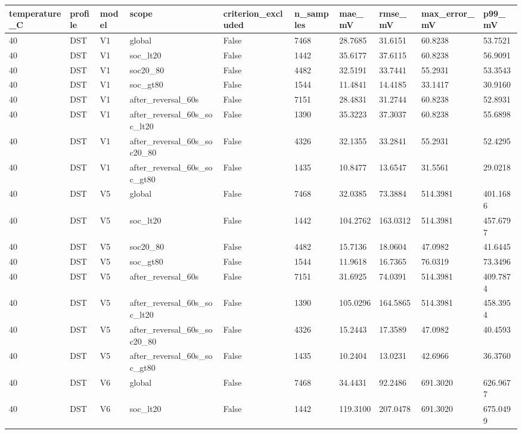 \begin{tabular}{llllllllll}
\hline
temperature\_C & profile & model & scope & criterion\_excluded & n\_samples & mae\_mV & rmse\_mV & max\_error\_mV & p99\_mV \\
\hline
40 & DST & V1 & global & False & 7468 & 28.7685 & 31.6151 & 60.8238 & 53.7521 \\
40 & DST & V1 & soc\_lt20 & False & 1442 & 35.6177 & 37.6115 & 60.8238 & 56.9091 \\
40 & DST & V1 & soc20\_80 & False & 4482 & 32.5191 & 33.7441 & 55.2931 & 53.3543 \\
40 & DST & V1 & soc\_gt80 & False & 1544 & 11.4841 & 14.4185 & 33.1417 & 30.9160 \\
40 & DST & V1 & after\_reversal\_60s & False & 7151 & 28.4831 & 31.2744 & 60.8238 & 52.8931 \\
40 & DST & V1 & after\_reversal\_60s\_soc\_lt20 & False & 1390 & 35.3223 & 37.3037 & 60.8238 & 55.6898 \\
40 & DST & V1 & after\_reversal\_60s\_soc20\_80 & False & 4326 & 32.1355 & 33.2841 & 55.2931 & 52.4295 \\
40 & DST & V1 & after\_reversal\_60s\_soc\_gt80 & False & 1435 & 10.8477 & 13.6547 & 31.5561 & 29.0218 \\
40 & DST & V5 & global & False & 7468 & 32.0385 & 73.3884 & 514.3981 & 401.1686 \\
40 & DST & V5 & soc\_lt20 & False & 1442 & 104.2762 & 163.0312 & 514.3981 & 457.6797 \\
40 & DST & V5 & soc20\_80 & False & 4482 & 15.7136 & 18.0604 & 47.0982 & 41.6445 \\
40 & DST & V5 & soc\_gt80 & False & 1544 & 11.9618 & 16.7365 & 76.0319 & 73.3496 \\
40 & DST & V5 & after\_reversal\_60s & False & 7151 & 31.6925 & 74.0391 & 514.3981 & 409.7874 \\
40 & DST & V5 & after\_reversal\_60s\_soc\_lt20 & False & 1390 & 105.0296 & 164.5865 & 514.3981 & 458.3954 \\
40 & DST & V5 & after\_reversal\_60s\_soc20\_80 & False & 4326 & 15.2443 & 17.3589 & 47.0982 & 40.4593 \\
40 & DST & V5 & after\_reversal\_60s\_soc\_gt80 & False & 1435 & 10.2404 & 13.0231 & 42.6966 & 36.3760 \\
40 & DST & V6 & global & False & 7468 & 34.4431 & 92.2486 & 691.3020 & 626.9677 \\
40 & DST & V6 & soc\_lt20 & False & 1442 & 119.3100 & 207.0478 & 691.3020 & 675.0499 \\

\end{tabular}
